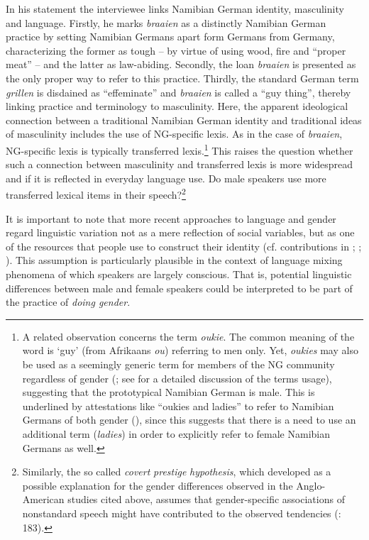 \documentclass[output=paper]{langsci/langscibook}
\begin{document}
In his statement the interviewee links Namibian German identity, masculinity and language. Firstly, he marks \textit{braaien} as a distinctly Namibian German practice by setting Namibian Germans apart form Germans from Germany, characterizing the former as tough – by virtue of using wood, fire and “proper meat” – and the latter as law-abiding. Secondly, the loan \textit{braaien} is presented as the only proper way to refer to this practice. Thirdly, the standard German term \textit{grillen} is disdained as “effeminate” and \textit{braaien} is called a “guy thing”, thereby linking practice and terminology to masculinity. Here, the apparent ideological connection between a traditional Namibian German identity and traditional ideas of masculinity includes the use of NG-specific lexis. As in the case of \textit{braaien}, NG-specific lexis is typically transferred lexis.\footnote{A
        related observation concerns the term \textit{oukie}. The common meaning of the word is ‘guy’ (from Afrikaans \textit{ou}) referring to men only. Yet, \textit{oukies} may also be used as a seemingly generic term for members of the NG community regardless of gender (\citealt{putz_dickschenarie_1982}; see  for a detailed discussion of the terms usage), suggesting that the prototypical Namibian German is male.
        This is underlined by attestations like “oukies and ladies” to refer to Namibian Germans of both gender (), since this suggests that there is a need to use an additional term (\textit{ladies}) in order to explicitly refer to female Namibian Germans as well.
} This raises the question whether such a connection between masculinity and transferred lexis is more widespread and if it is reflected in everyday language use. Do male speakers use more transferred lexical items in their speech?\footnote{Similarly, the so called \textit{covert} \textit{prestige} \textit{hypothesis}, which \citet{trudgill_sex_1972} developed as a possible explanation for the gender differences observed in the Anglo-American studies cited above, assumes that gender-specific associations of nonstandard speech might have contributed to the observed tendencies (\citealt{trudgill_sex_1972}: 183).}

It is important to note that more recent approaches to language and gender regard linguistic variation not as a mere reflection of social variables, but as one of the resources that people use to construct their identity (cf. contributions in \citealt{eckert_new_1999}; \citealt{coates_language_2011};  \citealt{eckert_three_2012}). This assumption is particularly plausible in the context of language mixing phenomena of which speakers are largely conscious. That is, potential linguistic differences between male and female speakers could be interpreted to be part of the practice of \textit{doing gender}.\largerpage
\end{document}
